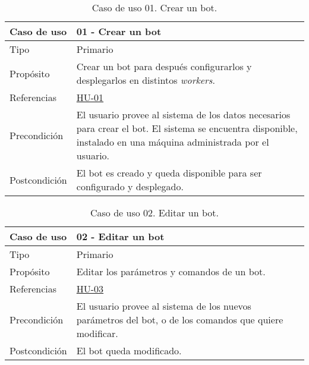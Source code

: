 \begin{table}[H]
    \centering
    \def\arraystretch{1.25}
    \begin{adjustbox}{max width=\textwidth}
    \begin{tabularx}{\textwidth}{|l|L|}
    \hline
        \textbf{Caso de uso} & \textbf{01 - Crear un bot} \\ \hline
    \hline
        Tipo & Primario \\ \hline
        Propósito & Crear un bot para después configurarlos y desplegarlos en distintos \textit{workers}. \\ \hline
        Referencias & \hyperref[sec:hu01]{HU-01} \\ \hline
        Precondición & El usuario provee al sistema de los datos necesarios para crear el bot. El sistema se encuentra disponible, instalado en una máquina administrada por el usuario.\\ \hline
        Postcondición & El bot es creado y queda disponible para ser configurado y desplegado. \\ \hline
    \end{tabularx}
    \end{adjustbox}
    \caption{Caso de uso 01. Crear un bot.}
\end{table}

\begin{table}[H]
    \centering
    \def\arraystretch{1.25}
    \begin{adjustbox}{max width=\textwidth}
    \begin{tabularx}{\textwidth}{|l|L|}
    \hline
        \textbf{Caso de uso} & \textbf{02 - Editar un bot} \\ \hline
    \hline
        Tipo & Primario \\ \hline
        Propósito & Editar los parámetros y comandos de un bot. \\ \hline
        Referencias & \hyperref[sec:hu03]{HU-03}\\ \hline
        Precondición & El usuario provee al sistema de los nuevos parámetros del bot, o de los comandos que quiere modificar. \\ \hline
        Postcondición & El bot queda modificado. \\ \hline
    \end{tabularx}
    \end{adjustbox}
    \caption{Caso de uso 02. Editar un bot.}
\end{table}

